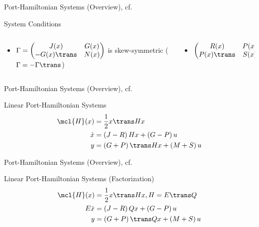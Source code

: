 \begin{frame}{Port-Hamiltonian Systems (Overview), cf.~\cite{VanDerSchaft2014}}
{\begin{block}{System Conditions}
            \begin{columns}[totalwidth=\linewidth]
                \begin{column}{.64\linewidth}
                    \begin{itemize}
                        \item $\Gamma = \begin{pmatrix}
                            J(x)  & G(x) \\
                            -G(x)\trans & N(x)
                        \end{pmatrix}$ is skew-symmetric ($\Gamma = -\Gamma\trans$)
                    \end{itemize}
                \end{column}
                \begin{column}{.34\linewidth}
                    \begin{itemize}
                        \item $\begin{pmatrix}
                            R(x)  & P(x) \\
                            P(x)\trans & S(x)
                        \end{pmatrix} \succcurlyeq 0$
                    \end{itemize}
                \end{column}
            \end{columns}
        \end{block}
    }
\end{frame}

\begin{frame}{Port-Hamiltonian Systems (Overview), cf.~\cite{VanDerSchaft2014}}
    \begin{block}{Linear Port-Hamiltonian Systems}
        \begin{align*}
            \mcl{H}(x) &= \frac{1}{2} x\trans H x \\
            \dot{x} &= \left( J - R \right) H x + \left( G - P \right) u \\
            y &= \left( G + P \right)\trans H x + \left( M + S \right) u
        \end{align*}
    \end{block}
\end{frame}

\begin{frame}{Port-Hamiltonian Systems (Overview), cf.~\cite{Morandin2022}}
    \begin{block}{Linear Port-Hamiltonian Systems (Factorization)}
        \begin{align*}
            \mcl{H}(x) &= \frac{1}{2} x\trans H x, H = E\trans Q \\
            E \dot{x} &= \left( J - R \right) Q x + \left( G - P \right) u \\
            y &= \left( G + P \right)\trans Q x + \left( M + S \right) u
        \end{align*}
    \end{block}
\end{frame}

